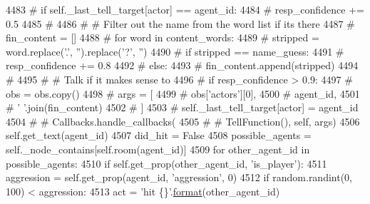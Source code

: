 \begin{DoxyCode}
4483             \textcolor{comment}{#             if self.\_last\_tell\_target[actor] == agent\_id:}
4484             \textcolor{comment}{#                 resp\_confidence += 0.5}
4485             \textcolor{comment}{#}
4486             \textcolor{comment}{#             # Filter out the name from the word list if its there}
4487             \textcolor{comment}{#             fin\_content = []}
4488             \textcolor{comment}{#             for word in content\_words:}
4489             \textcolor{comment}{#                 stripped = word.replace('.', '').replace('?', '')}
4490             \textcolor{comment}{#                 if stripped == name\_guess:}
4491             \textcolor{comment}{#                     resp\_confidence += 0.8}
4492             \textcolor{comment}{#                 else:}
4493             \textcolor{comment}{#                     fin\_content.append(stripped)}
4494             \textcolor{comment}{#}
4495             \textcolor{comment}{#             # Talk if it makes sense to}
4496             \textcolor{comment}{#             if resp\_confidence > 0.9:}
4497             \textcolor{comment}{#                 obs = obs.copy()}
4498             \textcolor{comment}{#                 args = [}
4499             \textcolor{comment}{#                     obs['actors'][0],}
4500             \textcolor{comment}{#                     agent\_id,}
4501             \textcolor{comment}{#                     ' '.join(fin\_content)}
4502             \textcolor{comment}{#                 ]}
4503             \textcolor{comment}{#                 self.\_last\_tell\_target[actor] = agent\_id}
4504             \textcolor{comment}{#                 # Callbacks.handle\_callbacks(}
4505             \textcolor{comment}{#                 #     TellFunction(), self, args)}
4506             self.get\_text(agent\_id)
4507             did\_hit = \textcolor{keyword}{False}
4508             possible\_agents = self.\_node\_contains[self.room(agent\_id)]
4509             \textcolor{keywordflow}{for} other\_agent\_id \textcolor{keywordflow}{in} possible\_agents:
4510                 \textcolor{keywordflow}{if} self.get\_prop(other\_agent\_id, \textcolor{stringliteral}{'is\_player'}):
4511                     aggression = self.get\_prop(agent\_id, \textcolor{stringliteral}{'aggression'}, 0)
4512                     \textcolor{keywordflow}{if} random.randint(0, 100) < aggression:
4513                         act = \textcolor{stringliteral}{'hit \{\}'}.\hyperlink{namespaceparlai_1_1chat__service_1_1services_1_1messenger_1_1shared__utils_a32e2e2022b824fbaf80c747160b52a76}{format}(other\_agent\_id)

\end{DoxyCode}
